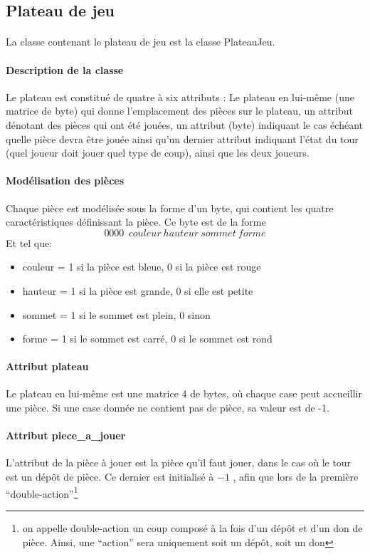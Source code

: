 \documentclass{article}
\begin{document}
\subsection{Plateau de jeu}
\paragraph{}
La classe contenant le plateau de jeu est la classe PlateauJeu.

\paragraph{Description de la classe}
Le plateau est constitué de quatre à six attributs : Le plateau en lui-même (une
matrice de byte) qui donne l'emplacement des pièces sur le plateau, 
un attribut dénotant des pièces qui ont été jouées, un attribut (byte)
indiquant le cas échéant quelle pièce devra être jouée ainsi qu'un dernier
attribut indiquant l'état du tour (quel joueur doit jouer quel type de
coup), ainsi que les deux joueurs.

\paragraph{Modélisation des pièces}
Chaque pièce est modélisée sous la forme d'un byte, qui contient les
quatre caractéristiques définissant la pièce. Ce byte est de la forme 
\[ 0000~~couleur~hauteur~sommet~forme \]
Et tel que:
\begin{itemize}
\item couleur = 1 si la pièce est bleue, 0 si la pièce est rouge
\item hauteur = 1 si la pièce est grande, 0 si elle est petite
\item sommet = 1 si le sommet est plein, 0 sinon
\item forme = 1 si le sommet est carré, 0 si le sommet est rond
\end{itemize}

\paragraph{Attribut plateau}
Le plateau en lui-même est une matrice 4  de bytes, o\`u
chaque case peut accueillir une pièce. Si une case donnée ne contient
pas de pièce, sa valeur est de -1.

\paragraph{Attribut piece\_a\_jouer}
L'attribut de la pièce à jouer est la pièce qu'il faut jouer, dans le
cas o\`u le tour est un dépôt de pièce. Ce dernier est initialisé à
\(-1\) , afin que lors de la première ``double-action''\footnote{ on
  appelle double-action un coup composé à la fois d'un dépôt et d'un
  don de pièce. Ainsi, une ``action'' sera uniquement soit un dépôt,
  soit un don}
\end{document}
